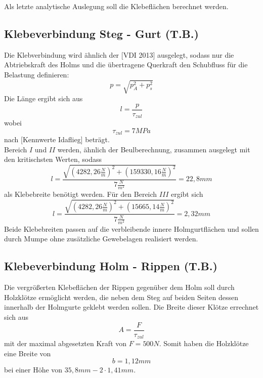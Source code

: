 Als letzte analytische Auslegung soll die Klebeflächen berechnet werden.
\subsection{Klebeverbindung Steg - Gurt (T.B.)}
Die Klebverbindung wird ähnlich der [VDI 2013]  ausgelegt, sodass nur die Abtriebskraft des Holms und die übertragene Querkraft den Schubfluss für die Belastung definieren:
\begin{equation}
	p=\sqrt{p_{A}^{2}+p_{s}^{2}}
\end{equation}
Die Länge ergibt sich aus 
\begin{equation}
	l=\frac{p}{\tau_{zul}}
\end{equation}
wobei 
\begin{equation}
	\tau_{zul}=7MPa
\end{equation}
nach [Kennwerte Idaflieg] beträgt.\\

\noindent Bereich $I$ und $II$ werden, ähnlich der Beulberechnung, zusammen ausgelegt mit den kritischsten Werten, sodass 
\begin{equation}
	l=\frac{\sqrt{(4282,26\frac{N}{m})^{2}+(159330,16\frac{N}{m})^{2}}}{7\frac{N}{m^{2}}}=22,8mm
\end{equation}
als Klebebreite benötigt werden. Für den Bereich $III$ ergibt sich
\begin{equation}
	l=\frac{\sqrt{(4282,26\frac{N}{m})^{2}+(15665,14\frac{N}{m})^{2}}}{7\frac{N}{m^{2}}}=2,32mm
\end{equation}
Beide Klebebreiten passen auf die verbleibende innere Holmgurtflächen und sollen durch Mumpe ohne zusätzliche Gewebelagen realisiert werden.

\subsection{Klebeverbindung Holm - Rippen (T.B.)}
Die vergrößerten Klebeflächen der Rippen gegenüber dem Holm soll durch Holzklötze ermöglicht werden, die neben dem Steg auf beiden Seiten dessen innerhalb der Holmgurte geklebt werden sollen. Die Breite dieser Klötze errechnet sich aus 
\begin{equation}
	A=\frac{F}{\tau_{zul}}
\end{equation}
mit der maximal abgesetzten Kraft von $F=500N$.
Somit haben die Holzklötze eine Breite von 
\begin{equation}
	b=1,12mm
\end{equation}
bei einer Höhe von $35,8mm-2\cdot 1,41mm$.